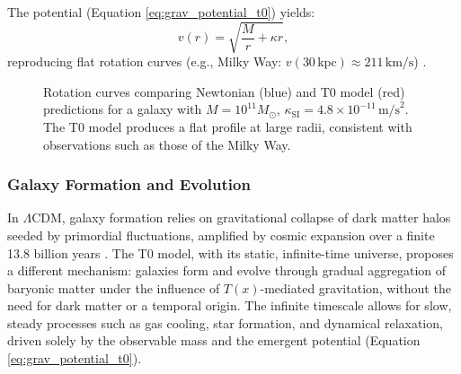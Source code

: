 \documentclass[12pt,a4paper]{article}
\newcommand{\Tfield}{T(x)}
\begin{document}
	
	The potential (Equation \ref{eq:grav_potential_t0}) yields:
	\begin{equation}
		v(r) = \sqrt{\frac{M}{r} + \kappa r},
		\label{eq:rotation_velocity}
	\end{equation}
	reproducing flat rotation curves (e.g., Milky Way: \(v(30 \, \text{kpc}) \approx 211 \, \text{km/s}\)) \cite{pascher_galaxies_2025}.
	
	\begin{figure}[h]
		\centering
		\caption{Rotation curves comparing Newtonian (blue) and T0 model (red) predictions for a galaxy with \(M = 10^{11} M_{\odot}\), \(\kappa_{\text{SI}} = 4.8 \times 10^{-11} \, \text{m/s}^2\). The T0 model produces a flat profile at large radii, consistent with observations such as those of the Milky Way.}
		\label{fig:rotation_curves}
	\end{figure}
	
	\subsubsection{Galaxy Formation and Evolution}
	In \(\Lambda\)CDM, galaxy formation relies on gravitational collapse of dark matter halos seeded by primordial fluctuations, amplified by cosmic expansion over a finite 13.8 billion years \cite{Planck2020}. The T0 model, with its static, infinite-time universe, proposes a different mechanism: galaxies form and evolve through gradual aggregation of baryonic matter under the influence of \(\Tfield\)-mediated gravitation, without the need for dark matter or a temporal origin. The infinite timescale allows for slow, steady processes such as gas cooling, star formation, and dynamical relaxation, driven solely by the observable mass and the emergent potential (Equation \ref{eq:grav_potential_t0}).
	
\end{document}
